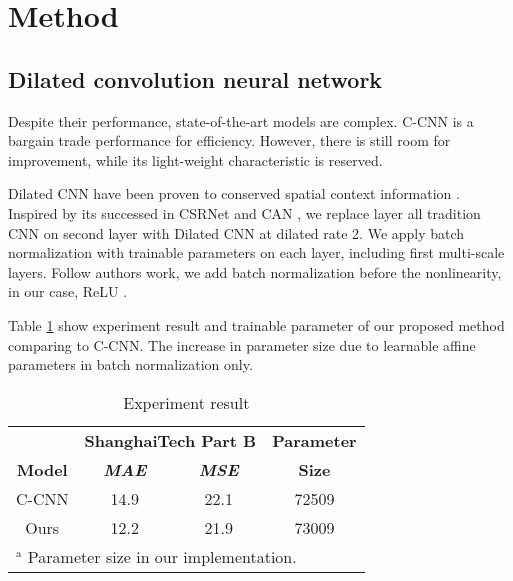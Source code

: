 \section{Method}

\subsection{Dilated convolution neural network}
Despite their performance, state-of-the-art models are complex. C-CNN is a bargain trade performance for efficiency. However, there is still room for improvement, while its light-weight characteristic is reserved. 

Dilated CNN have been proven to conserved spatial context information \cite{li2018csrnet}. Inspired by its successed in CSRNet \cite{li2018csrnet} and CAN \cite{liu2019context}, we replace layer all tradition CNN on second layer with Dilated CNN at dilated rate 2. We apply batch normalization \cite{ioffe2015batch} with trainable parameters on each layer, including first multi-scale layers. Follow authors work, we add batch normalization before the nonlinearity, in our case, ReLU \cite{agarap2018deep}. 



Table \ref{tab:experiment-result} show experiment result and trainable parameter of our proposed method comparing to C-CNN. The increase in parameter size due to learnable affine parameters in batch normalization only. 

\begin{table}[htbp]
\caption{\label{tab:experiment-result}  Experiment result}
\begin{center}
\begin{tabular}{|c|c|c|c|}
\hline
\textbf{}&\multicolumn{2}{|c|}{\textbf{ShanghaiTech Part B}}&\textbf{Parameter} \\
\cline{1-3}
\textbf{Model} & \textbf{\textit{MAE}}& \textbf{\textit{MSE}}&\textbf{Size} \\
\hline
C-CNN & 14.9 & 22.1 & 72509   \\
\hline
Ours & 12.2 & 21.9 & 73009 \\
\hline
\multicolumn{4}{l}{$^{\mathrm{a}}$ Parameter size in our implementation.}
\end{tabular}

\end{center}
\end{table}


